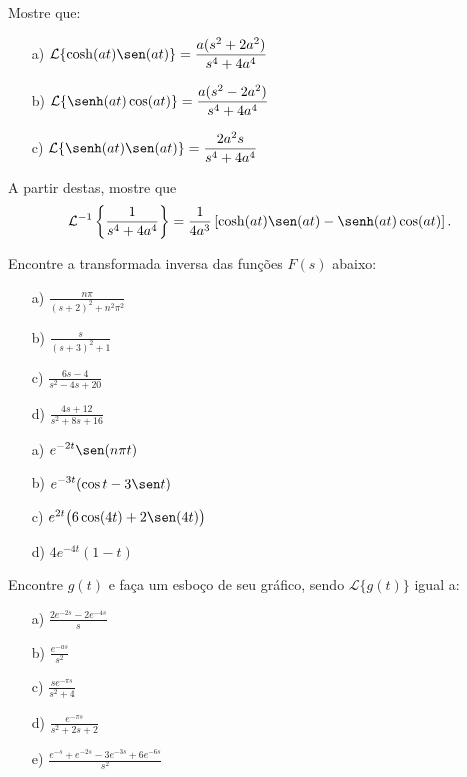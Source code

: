 \begin{exer}
Mostre que:
\begin{itemize}
  \item[a)] $\displaystyle \mathcal{L}\{ \cosh (at) \sen (at) \} = \frac{a (s^2 + 2 a^2)}{s^4 + 4a^4}$
  \item[b)] $\displaystyle \mathcal{L} \{ \senh (at) \cos (at) \} = \frac{a (s^2 - 2 a^2)}{s^4 + 4a^4}$
  \item[c)] $\displaystyle \mathcal{L} \{ \senh (at) \sen (at) \} = \frac{2 a^2 s}{s^4 + 4a^4}$
\end{itemize}
 \noindent A partir destas, mostre que 
 \begin{equation}\mathcal{L}^{-1}\left\{ \frac{1}{s^4 + 4a^4}\right\} = \frac{1}{4a^3} \left[\cosh (at) \sen (at) - \senh (at) \cos(at)\right].   
 \end{equation}

\end{exer}
\begin{exer}
Encontre a transformada inversa das funções $F(s)$ abaixo:
\begin{itemize}
  \item[a)] $\displaystyle \frac{n\pi}{(s+2)^2 + n^2\pi^2}$
  \item[b)] $\displaystyle \frac{s}{(s+3)^2+1}$
  \item[c)] $\displaystyle \frac{6s-4}{s^2 - 4s +20}$
  \item[d)] $\displaystyle \frac{4s + 12}{s^2 + 8s + 16}$
\end{itemize}
\end{exer}
\begin{resp}
\begin{itemize}
\item[a)] $\displaystyle e^{-2t} \sen (n\pi t)$
  \item[b)] $\displaystyle e^{-3t} (\cos t - 3\sen  t)$
  \item[c)] $e^{2t} \big(6\cos (4t) + 2 \sen (4t)\big)$
  \item[d)] $\displaystyle 4e^{-4t} (1-t)$
\end{itemize}
  \end{resp}
  \begin{exer}
Encontre $g(t)$ e faça um esboço de seu gráfico, sendo $\mathcal{L}\{ g(t)\}$ igual a:
\begin{itemize}
  \item[a)] $\displaystyle \frac{2e^{-2s} - 2 e^{-4s}}{s}$
  \item[b)] $\displaystyle \frac{e^{-as}}{s^2}$
  \item[c)] $\displaystyle \frac{se^{-\pi s}}{s^2+4}$
  \item[d)] $\displaystyle \frac{e^{-\pi s}}{s^2 + 2s +2}$
  \item[e)] $\displaystyle \frac{e^{-s}+ e^{-2s} -3 e^{-3s} +6 e^{-6s}}{s^2}$
\end{itemize}
\end{exer}
